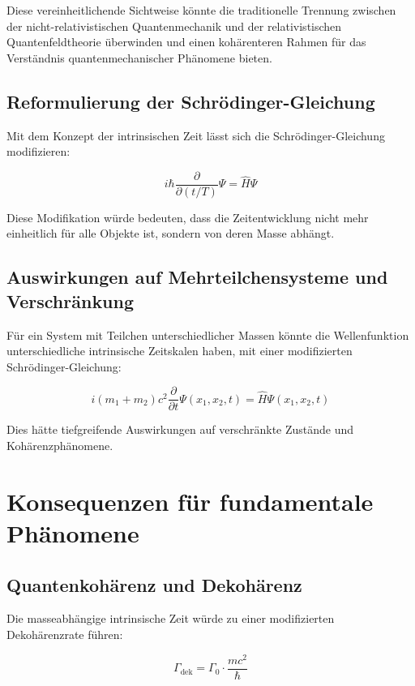 \documentclass[12pt,a4paper]{article}  %
\begin{document}
	Diese vereinheitlichende Sichtweise könnte die traditionelle Trennung zwischen der nicht-relativistischen Quantenmechanik und der relativistischen Quantenfeldtheorie überwinden und einen kohärenteren Rahmen für das Verständnis quantenmechanischer Phänomene bieten.
	
	\subsection{Reformulierung der Schrödinger-Gleichung}
	
	Mit dem Konzept der intrinsischen Zeit lässt sich die Schrödinger-Gleichung modifizieren:
	
	\begin{equation}
		i\hbar \frac{\partial}{\partial (t/T)}\Psi = \hat{H}\Psi
	\end{equation}
	
	Diese Modifikation würde bedeuten, dass die Zeitentwicklung nicht mehr einheitlich für alle Objekte ist, sondern von deren Masse abhängt.
	
	\subsection{Auswirkungen auf Mehrteilchensysteme und Verschränkung}
	
	Für ein System mit Teilchen unterschiedlicher Massen könnte die Wellenfunktion unterschiedliche intrinsische Zeitskalen haben, mit einer modifizierten Schrödinger-Gleichung:
	
	\begin{equation}
		i (m_1 + m_2) c^2 \frac{\partial}{\partial t} \Psi(x_1, x_2, t) = \hat{H} \Psi(x_1, x_2, t)
	\end{equation}
	
	Dies hätte tiefgreifende Auswirkungen auf verschränkte Zustände und Kohärenzphänomene.
	
	\section{Konsequenzen für fundamentale Phänomene}
	
	\subsection{Quantenkohärenz und Dekohärenz}
	
	Die masseabhängige intrinsische Zeit würde zu einer modifizierten Dekohärenzrate führen:
	
	\begin{equation}
		\Gamma_{\text{dek}} = \Gamma_0 \cdot \frac{mc^2}{\hbar}
	\end{equation}
	
\end{document}
